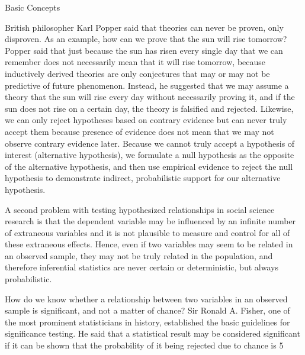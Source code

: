 Basic Concepts

British philosopher Karl Popper said that theories can never be proven, only disproven. As an example, how can we prove that the sun will rise tomorrow? Popper said that just because the sun has risen every single day that we can remember does not necessarily mean that it will rise tomorrow, because inductively derived theories are only conjectures that may or may not be predictive of future phenomenon. Instead, he suggested that we may assume a theory that the sun will rise every day without necessarily proving it, and if the sun does not rise on a certain day, the theory is falsified and rejected. Likewise, we can only reject hypotheses based on contrary evidence but can never truly accept them because presence of evidence does not mean that we may not observe contrary evidence later. Because we cannot truly accept a hypothesis of interest (alternative hypothesis), we formulate a null hypothesis as the opposite of the alternative hypothesis, and then use empirical evidence to reject the null hypothesis to demonstrate indirect, probabilistic support for our alternative hypothesis. 

A second problem with testing hypothesized relationships in social science research is that the dependent variable may be influenced by an infinite number of extraneous variables and it is not plausible to measure and control for all of these extraneous effects. Hence, even if two variables may seem to be related in an observed sample, they may not be truly related in the population, and therefore inferential statistics are never certain or deterministic, but always probabilistic.

How do we know whether a relationship between two variables in an observed sample is significant, and not a matter of chance? Sir Ronald A. Fisher, one of the most prominent statisticians in history, established the basic guidelines for significance testing. He said that a statistical result may be considered significant if it can be shown that the probability of it being rejected due to chance is 5%


